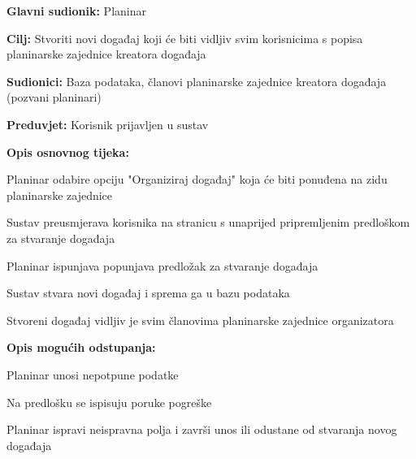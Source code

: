 			\noindent {}
		\begin{packed_item}
			
			\item \textbf{Glavni sudionik: }$ $Planinar$ $
			\item  \textbf{Cilj:} $ $Stvoriti novi događaj koji će biti vidljiv svim korisnicima s popisa planinarske zajednice kreatora događaja$ $
			\item  \textbf{Sudionici:} $ $Baza podataka, članovi planinarske zajednice kreatora događaja (pozvani planinari)$ $
			\item  \textbf{Preduvjet:} $ $Korisnik prijavljen u sustav$ $
			\item  \textbf{Opis osnovnog tijeka:}
			
			\item[] \begin{packed_enum}
				
				\item $ $Planinar odabire opciju "Organiziraj događaj" koja će biti ponuđena na zidu planinarske zajednice$ $
				\item $ $Sustav preusmjerava korisnika na stranicu s unaprijed pripremljenim predloškom za stvaranje događaja$ $
				\item $ $Planinar ispunjava popunjava predložak za stvaranje događaja$ $	
				\item $ $Sustav stvara novi događaj i sprema ga u bazu podataka$ $
				\item $ $Stvoreni događaj vidljiv je svim članovima planinarske zajednice organizatora$ $ 
			\end{packed_enum}
			\item  \textbf{Opis mogućih odstupanja:}
			
			\item[] \begin{packed_item}
				
				\item[3.a] $ $Planinar unosi nepotpune podatke$ $
				\item[] \begin{packed_enum}
					\item $ $Na predlošku se ispisuju poruke pogreške$ $
					\item $ $Planinar ispravi neispravna polja i završi unos ili odustane od stvaranja novog događaja$ $
				\end{packed_enum}
			\end{packed_item}
		\end{packed_item}
	
